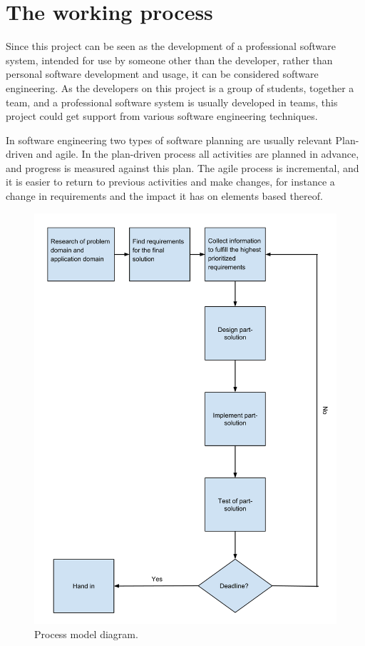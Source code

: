 \chapter{The working process}
Since this project can be seen as the development of a professional software system, intended for use by someone other than the developer, rather than personal software development and usage, it can be considered software engineering\cite{sommerville9ed}. As the developers on this project is a group of students, together a team, and a professional software system is usually developed in teams, this project could get support from various software engineering techniques.

In software engineering two types of software planning are usually relevant\cite{sommerville9ed} Plan-driven and agile. In the plan-driven process all activities are planned in advance, and progress is measured against this plan\cite{sommerville9ed}. The agile process is incremental, and it is easier to return to previous activities and make changes, for instance a change in requirements and the impact it has on elements based thereof.

\begin{figure}[h!]
\centering
\includegraphics[width=1.2\textwidth]{figures/ProcessmodelDiagram.png}
\caption{Process model diagram.}
\label{fig:processmodelDiagram}
\end{figure}

